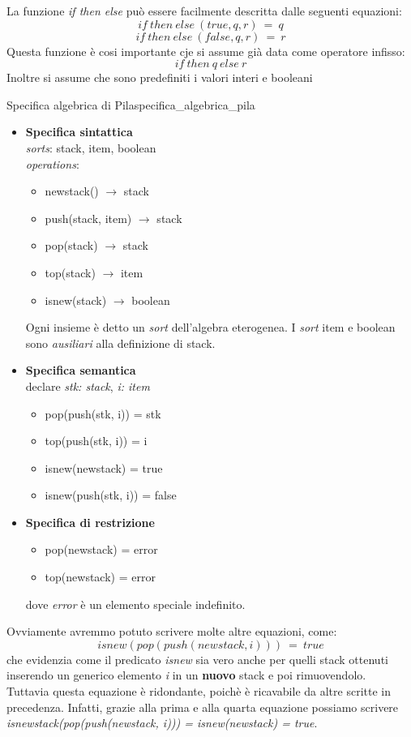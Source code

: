 \documentclass[12pt]{report}
\newcommand{\nmu}{}
\begin{document}
 		La funzione \textit{if then else} può essere facilmente descritta dalle seguenti equazioni:
 		\[
 		if\ then\ else\ (true, q, r)\ =\ q
 		\]
 		\[
 		if\ then\ else\ (false, q, r)\ =\ r
 		\]
 		Questa funzione è cosi importante cje si assume già data come operatore infisso:
 		\[
 		if\ then\ q\ else\ r
 		\]
 		Inoltre si assume che sono predefiniti i valori interi e booleani
 	\begin{example}{\nmu Specifica algebrica di Pila}{specifica_algebrica_pila}
 		\begin{itemize}
 			\item \textbf{Specifica sintattica} \\
 			\quad \textit{sorts}: stack, item, boolean \\
 			\quad \textit{operations}:
 			\begin{itemize}
 				\item newstack() $\to$ stack
 				\item push(stack, item) $\to$ stack
 				\item pop(stack) $\to$ stack
 				\item top(stack) $\to$ item
 				\item isnew(stack) $\to$ boolean
 			\end{itemize}
 			Ogni insieme è detto un \textit{sort} dell'algebra eterogenea. I \textit{sort} item e boolean sono \textit{ausiliari} alla definizione di stack.
 			\item \textbf{Specifica semantica} \\
 			\quad declare \textit{stk: stack}, \textit{i: item}
 			\begin{itemize}
 				\item pop(push(stk, i)) = stk
 				\item top(push(stk, i)) = i
 				\item isnew(newstack) = true
 				\item isnew(push(stk, i)) = false
 			\end{itemize}
 			\item \textbf{Specifica di restrizione}
 			\begin{itemize}
 				\item pop(newstack) = error
 				\item top(newstack) = error
 			\end{itemize}
 			dove \textit{error} è un elemento speciale indefinito.
 		\end{itemize}
 		Ovviamente avremmo potuto scrivere molte altre equazioni, come:
 		\[
 		isnew(pop(push(newstack, i)))\ =\ true
 		\]
 		che evidenzia come il predicato \textit{isnew} sia vero anche per quelli stack ottenuti inserendo un generico elemento \textit{i} in un \textbf{nuovo} stack e poi rimuovendolo. \\
 		Tuttavia questa equazione è ridondante, poichè è ricavabile da altre scritte in precedenza. Infatti, grazie alla prima e alla quarta equazione possiamo scrivere \textit{isnewstack(pop(push(newstack, i))) = isnew(newstack) = true}.
 	\end{example}
\end{document}
